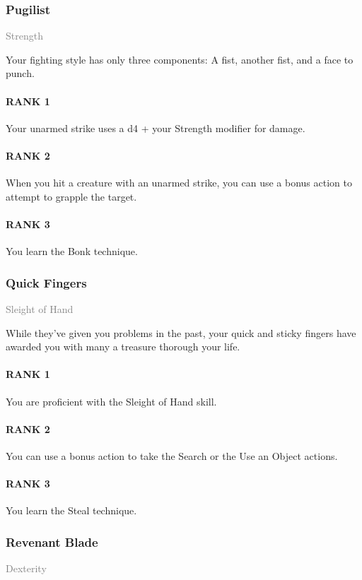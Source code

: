 \subsubsection{Pugilist} \label{tal::pugilist}
\small{\textcolor{gray}{Strength}}

\normalsize
Your fighting style has only three components:
A fist, another fist, and a face to punch.
\paragraph{RANK 1} Your unarmed strike uses a d4 + your Strength modifier for damage.
\paragraph{RANK 2} When you hit a creature with an unarmed strike, you can use a bonus action to attempt to grapple the target.
\paragraph{RANK 3} You learn the Bonk technique.

\subsubsection{Quick Fingers} \label{tal::quickfingers}
\small{\textcolor{gray}{Sleight of Hand}}

\normalsize
While they've given you problems in the past, your quick and sticky fingers have awarded you with many a treasure thorough your life.
\paragraph{RANK 1} You are proficient with the Sleight of Hand skill.
\paragraph{RANK 2} You can use a bonus action to take the Search or the Use an Object actions.
\paragraph{RANK 3} You learn the Steal technique.

\subsubsection{Revenant Blade} \label{tal::revenantblade}
\small{\textcolor{gray}{Dexterity}}

